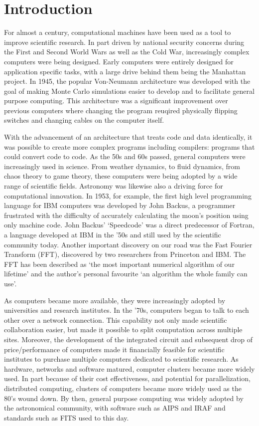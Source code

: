 \section{Introduction}\label{sec:intro_intro}

For almost a century, computational machines have been used as a tool to improve scientific research. In part driven by national security concerns during the First and Second World Wars as well as the Cold War, increasingly complex computers were being designed. Early computers were entirely designed for application specific tasks, with a large drive behind them being the Manhattan project. In 1945, the popular Von-Neumann architecture was developed with the goal of making Monte Carlo simulations easier to develop and to facilitate general purpose computing. This architecture was a significant improvement over previous computers where changing the program reuqired physically flipping switches and changing cables on the computer itself.

With the advancement of an architecture that treats code and data identically, it was possible to create more complex programs including compilers: programs that could convert code to code. As the 50s and 60s passed, general computers were increasingly used in science. From weather dynamics, to fluid dynamics, from chaos theory to game theory, these computers were being adopted by a wide range of scientific fields. Astronomy was likewise also a driving force for computational innovation. In 1953, for example, the first high level programming language for IBM computers was developed by John Backus, a programmer frustrated with the difficulty of accurately calculating the moon's position using only machine code. John Backus' `Speedcode' was a direct predecessor of Fortran, a language developed at IBM in the '50s and still used by the scientific community today. Another important discovery on our road was the Fast Fourier Transform (FFT), discovered by two researchers from Princeton and IBM. The FFT has been described as `the most important numerical algorithm of our lifetime' and the author's personal favourite `an algorithm the whole family can use'\citep{top_10_algos}. 

As computers became more available, they were increasingly adopted by universities and research institutes. In the '70s, computers began to talk to each other over a network connection. This capability not only made scientific collaboration easier, but made it possible to split computation across multiple sites. Moreover, the development of the integrated circuit and subsequent drop of price/performance of computers made it financially feasible for scientific institutes to purchase multiple computers dedicated to scientific research. As hardware, networks and software matured, computer clusters became more widely used\citep{tel_2000}. In part because of their cost effectiveness, and potential for parallelization, distributed computing, clusters of computers became more widely used as the 80's wound down. By then, general purpose computing was widely adopted by the astronomical community, with software such as AIPS and IRAF and standards such as FITS used to this day. 

